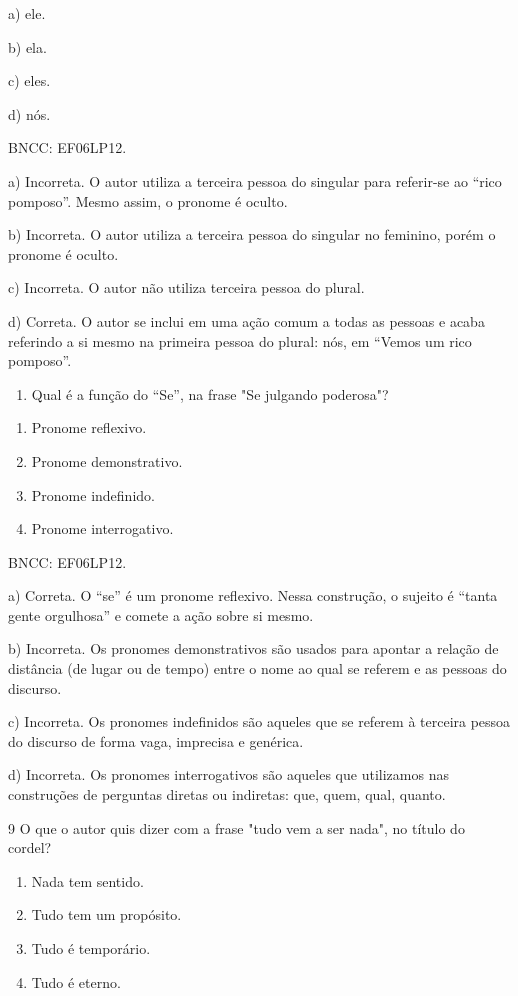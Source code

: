 a) ele.

b) ela.

c) eles.

d) nós.

BNCC: EF06LP12.

a) Incorreta. O autor utiliza a terceira pessoa do singular para
referir-se ao ``rico pomposo''. Mesmo assim, o pronome é oculto.

b) Incorreta. O autor utiliza a terceira pessoa do singular no feminino,
porém o pronome é oculto.

c) Incorreta. O autor não utiliza terceira pessoa do plural.

d) Correta. O autor se inclui em uma ação comum a todas as pessoas e
acaba referindo a si mesmo na primeira pessoa do plural: nós, em ``Vemos
um rico pomposo''.

\begin{enumerate}
\def\labelenumi{\arabic{enumi}.}
\setcounter{enumi}{7}
\tightlist
\item
  Qual é a função do ``Se'', na frase "Se julgando poderosa"?
\end{enumerate}

\begin{enumerate}
\def\labelenumi{\alph{enumi})}
\item
  Pronome reflexivo.
\item
  Pronome demonstrativo.
\item
  Pronome indefinido.
\item
  Pronome interrogativo.
\end{enumerate}

BNCC: EF06LP12.

a) Correta. O ``se'' é um pronome reflexivo. Nessa construção, o sujeito
é ``tanta gente orgulhosa'' e comete a ação sobre si mesmo.

b) Incorreta. Os pronomes demonstrativos são usados para apontar a
relação de distância (de lugar ou de tempo) entre o nome ao qual se
referem e as pessoas do discurso.

c) Incorreta. Os pronomes indefinidos são aqueles que se referem à
terceira pessoa do discurso de forma vaga, imprecisa e genérica.

d) Incorreta. Os pronomes interrogativos são aqueles que utilizamos nas
construções de perguntas diretas ou indiretas: que, quem, qual, quanto.

\num{9} O que o autor quis dizer com a frase "tudo vem a ser nada", no
título do cordel?

\begin{enumerate}
\def\labelenumi{\alph{enumi})}
\item
  Nada tem sentido.
\item
  Tudo tem um propósito.
\item
  Tudo é temporário.
\item
  Tudo é eterno.
\end{enumerate}


